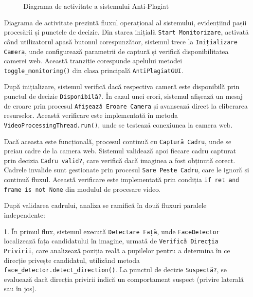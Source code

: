 \documentclass[12pt,a4paper]{article}
\begin{document}
\begin{figure}[H]
    \caption{Diagrama de activitate a sistemului Anti-Plagiat}
\end{figure}

Diagrama de activitate prezintă fluxul operațional al sistemului, evidențiind pașii procesării și punctele de decizie. Din starea inițială \texttt{Start Monitorizare}, activată când utilizatorul apasă butonul corespunzător, sistemul trece la \texttt{Inițializare Camera}, unde configurează parametrii de captură și verifică disponibilitatea camerei web. Această tranziție corespunde apelului metodei \texttt{toggle\_monitoring()} din clasa principală \texttt{AntiPlagiatGUI}.

După inițializare, sistemul verifică dacă respectiva cameră este disponibilă prin punctul de decizie \texttt{Disponibilă?}. În cazul unei erori, sistemul afișează un mesaj de eroare prin procesul \texttt{Afișează Eroare Camera} și avansează direct la eliberarea resurselor. Această verificare este implementată în metoda \texttt{VideoProcessingThread.run()}, unde se testează conexiunea la camera web.

Dacă aceasta este funcțională, procesul continuă cu \texttt{Captură Cadru}, unde se preiau cadre de la camera web. Sistemul validează apoi fiecare cadru capturat prin decizia \texttt{Cadru valid?}, care verifică dacă imaginea a fost obținută corect. Cadrele invalide sunt gestionate prin procesul \texttt{Sare Peste Cadru}, care le ignoră și continuă fluxul. Această verificare este implementată prin condiția \texttt{if ret and frame is not None} din modulul de procesare video.

După validarea cadrului, analiza se ramifică în două fluxuri paralele independente:

1. În primul flux, sistemul execută \texttt{Detectare Față}, unde \texttt{FaceDetector} localizează fața candidatului în imagine, urmată de \texttt{Verifică Direcția Privirii}, care analizează poziția reală a pupilelor pentru a determina în ce direcție privește candidatul, utilizând metoda \texttt{face\_detector.detect\_direction()}. La punctul de decizie \texttt{Suspectă?}, se evaluează dacă direcția privirii indică un comportament suspect (privire laterală sau în jos).
\end{document}
